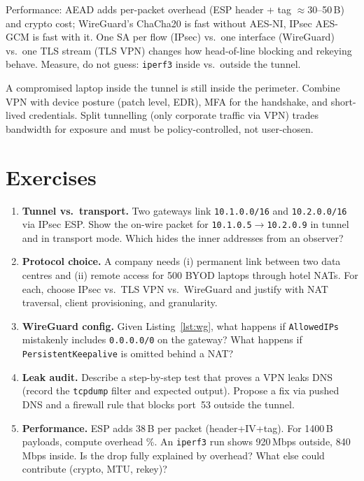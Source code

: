 Performance: AEAD adds per-packet overhead (ESP header + tag $\approx$30--50\,B)
and crypto cost; WireGuard's ChaCha20 is fast without AES-NI, IPsec AES-GCM
is fast with it. One SA per flow (IPsec) vs.\ one interface (WireGuard) vs.\
one TLS stream (TLS VPN) changes how head-of-line blocking and rekeying
behave. Measure, do not guess: \texttt{iperf3} inside vs.\ outside the tunnel.

\begin{remark}\label{rem:vpn-limits}
A compromised laptop inside the tunnel is still inside the perimeter.
Combine VPN with device posture (patch level, EDR), MFA for the handshake,
and short-lived credentials. Split tunnelling (only corporate traffic via VPN)
trades bandwidth for exposure and must be policy-controlled, not user-chosen.
\end{remark}

\section{Exercises}\label{sec:ch04-exercises}
\begin{enumerate}[label=E4.\arabic*, leftmargin=*, itemsep=0.6em]
    \item \textbf{Tunnel vs.\ transport.} Two gateways link \texttt{10.1.0.0/16}
    and \texttt{10.2.0.0/16} via IPsec ESP. Show the on-wire packet for
    \texttt{10.1.0.5$\to$10.2.0.9} in tunnel and in transport mode. Which hides
    the inner addresses from an observer?
    \item \textbf{Protocol choice.} A company needs (i) permanent link between two
    data centres and (ii) remote access for 500 BYOD laptops through hotel NATs.
    For each, choose IPsec vs.\ TLS VPN vs.\ WireGuard and justify with NAT
    traversal, client provisioning, and granularity.
    \item \textbf{WireGuard config.} Given Listing~\ref{lst:wg}, what happens if
    \texttt{AllowedIPs} mistakenly includes \texttt{0.0.0.0/0} on the gateway?
    What happens if \texttt{PersistentKeepalive} is omitted behind a NAT?
    \item \textbf{Leak audit.} Describe a step-by-step test that proves a VPN
    leaks DNS (record the \texttt{tcpdump} filter and expected output). Propose a
    fix via pushed DNS and a firewall rule that blocks port~53 outside the tunnel.
    \item \textbf{Performance.} ESP adds 38\,B per packet (header+IV+tag). For
    1400\,B payloads, compute overhead \%. An \texttt{iperf3} run shows 920\,Mbps
    outside, 840\,Mbps inside. Is the drop fully explained by overhead? What else
    could contribute (crypto, MTU, rekey)?
\end{enumerate}

